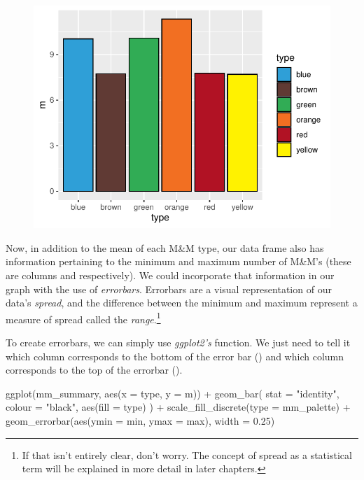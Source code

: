 \begin{figure}[H]
\includegraphics[scale = .75]{graphics/ch3Figs/bar_2.pdf}
\end{figure}

Now, in addition to the mean of each M\&M type, our data frame also has information pertaining to the minimum and maximum number of M\&M's (these are columns  and  respectively). We could incorporate that information in our graph with the use of \textit{errorbars}.  Errorbars are a visual representation of our data's \textit{spread}, and the difference between the minimum and maximum represent a measure of spread called the \textit{range}.\footnote{If that isn't entirely clear, don't worry. The concept of spread as a statistical term will be explained in more detail in later chapters.}

To create errorbars, we can simply use \textit{ggplot2's}  function. We just need to tell it which column corresponds to the bottom of the error bar () and which column corresponds to the top of the errorbar ().

\begin{inR}
ggplot(mm_summary, aes(x = type, y = m)) +
  geom_bar(
    stat = "identity",
    colour = "black",
    aes(fill = type)
  ) +
  scale_fill_discrete(type = mm_palette) +
  geom_errorbar(aes(ymin = min, ymax = max), width = 0.25)
\end{inR}

\vspace{2em}

